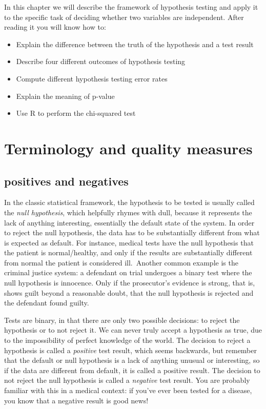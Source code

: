 \documentclass[
  letterpaper,
  DIV=11,
  numbers=noendperiod]{scrreprt}
\providecommand{\tightlist}{%
  \setlength{\itemsep}{0pt}\setlength{\parskip}{0pt}}\usepackage{longtable,booktabs,array}
\begin{document}
In this chapter we will describe the framework of hypothesis testing and
apply it to the specific task of deciding whether two variables are
independent. After reading it you will know how to:

\begin{itemize}
\tightlist
\item
  Explain the difference between the truth of the hypothesis and a test
  result
\item
  Describe four different outcomes of hypothesis testing
\item
  Compute different hypothesis testing error rates
\item
  Explain the meaning of p-value
\item
  Use R to perform the chi-squared test
\end{itemize}

\hypertarget{terminology-and-quality-measures}{%
\section{Terminology and quality
measures}\label{terminology-and-quality-measures}}

\hypertarget{positives-and-negatives}{%
\subsection{positives and negatives}\label{positives-and-negatives}}

In the classic statistical framework, the hypothesis to be tested is
usually called the \emph{null hypothesis}, which helpfully rhymes with
dull, because it represents the lack of anything interesting,
essentially the default state of the system. In order to reject the null
hypothesis, the data has to be substantially different from what is
expected as default. For instance, medical tests have the null
hypothesis that the patient is normal/healthy, and only if the results
are substantially different from normal the patient is considered
ill.~Another common example is the criminal justice system: a defendant
on trial undergoes a binary test where the null hypothesis is innocence.
Only if the prosecutor's evidence is strong, that is, shows guilt beyond
a reasonable doubt, that the null hypothesis is rejected and the
defendant found guilty.

Tests are binary, in that there are only two possible decisions: to
reject the hypothesis or to not reject it. We can never truly accept a
hypothesis as true, due to the impossibility of perfect knowledge of the
world. The decision to reject a hypothesis is called a \emph{positive}
test result, which seems backwards, but remember that the default or
null hypothesis is a lack of anything unusual or interesting, so if the
data are different from default, it is called a positive result. The
decision to not reject the null hypothesis is called a \emph{negative}
test result. You are probably familiar with this in a medical context:
if you've ever been tested for a disease, you know that a negative
result is good news!
\end{document}
